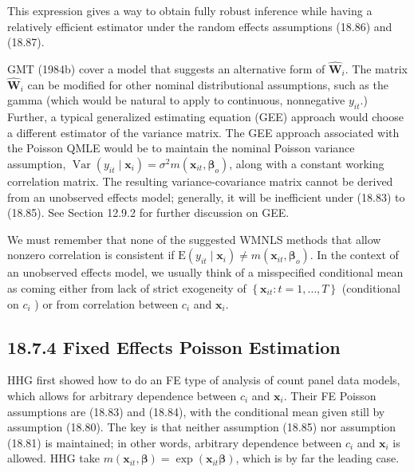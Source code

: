 \documentclass[10pt]{article}
\begin{document}
This expression gives a way to obtain fully robust inference while having a relatively efficient estimator under the random effects assumptions (18.86) and (18.87).

GMT (1984b) cover a model that suggests an alternative form of $\hat{\mathbf{W}}_{i}$. The matrix $\hat{\mathbf{W}}_{i}$ can be modified for other nominal distributional assumptions, such as the gamma (which would be natural to apply to continuous, nonnegative $y_{i t}$.) Further, a typical generalized estimating equation (GEE) approach would choose a different estimator of the variance matrix. The GEE approach associated with the Poisson QMLE would be to maintain the nominal Poisson variance assumption, $\operatorname{Var}\left(y_{i t} \mid \mathbf{x}_{i}\right)=\sigma^{2} m\left(\mathbf{x}_{i t}, \boldsymbol{\beta}_{o}\right)$, along with a constant working correlation matrix. The resulting variance-covariance matrix cannot be derived from an unobserved effects model; generally, it will be inefficient under (18.83) to (18.85). See Section 12.9.2 for further discussion on GEE.

We must remember that none of the suggested WMNLS methods that allow nonzero correlation is consistent if $\mathrm{E}\left(y_{i t} \mid \mathbf{x}_{i}\right) \neq m\left(\mathbf{x}_{i t}, \boldsymbol{\beta}_{o}\right)$. In the context of an unobserved effects model, we usually think of a misspecified conditional mean as coming either from lack of strict exogeneity of $\left\{\mathbf{x}_{i t}: t=1, \ldots, T\right\}$ (conditional on $c_{i}$ ) or from correlation between $c_{i}$ and $\mathbf{x}_{i}$.

\subsection*{18.7.4 Fixed Effects Poisson Estimation}
HHG first showed how to do an FE type of analysis of count panel data models, which allows for arbitrary dependence between $c_{i}$ and $\mathbf{x}_{i}$. Their FE Poisson assumptions are (18.83) and (18.84), with the conditional mean given still by assumption (18.80). The key is that neither assumption (18.85) nor assumption (18.81) is maintained; in other words, arbitrary dependence between $c_{i}$ and $\mathbf{x}_{i}$ is allowed. HHG take $m\left(\mathbf{x}_{i t}, \boldsymbol{\beta}\right)=\exp \left(\mathbf{x}_{i t} \boldsymbol{\beta}\right)$, which is by far the leading case.
\end{document}
